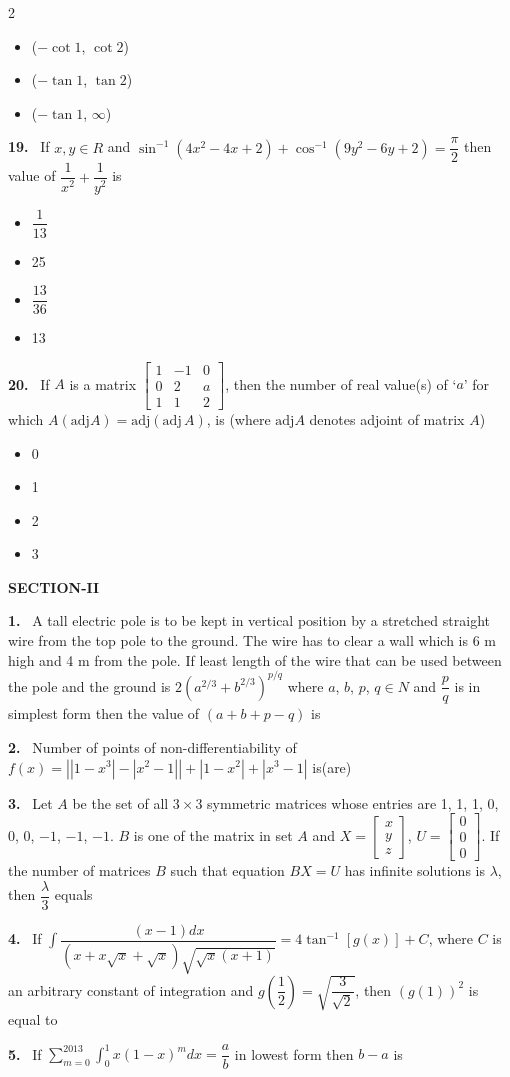 \documentclass[10pt]{extarticle}
\newcommand{\sect}[1]{\par\smallskip\noindent\textbf{#1}\par}
\newcommand{\qn}[1]{\par\smallskip\noindent\textbf{#1.}~}
\newenvironment{qoptions}{\begin{itemize}[leftmargin=1.8em,itemsep=1pt,topsep=2pt,label={}]}{\end{itemize}}
\newcommand{\opt}[2]{\item[(#1)] #2}
\begin{document}
\begin{multicols}{2}
\begin{qoptions}
\opt{B}{($-\cot1$, $\cot2$)}
\opt{C}{($-\tan1$, $\tan2$)}
\opt{D}{($-\tan1$, $\infty$)}
\end{qoptions}
\qn{19} If $x,y\in R$ and $\sin^{-1}\left(4x^2-4x+2\right)+\cos^{-1}\left(9y^2-6y+2\right)=\dfrac\pi2$ then value of $\dfrac1{x^2}+\dfrac1{y^2}$ is
\begin{qoptions}
\opt{A}{$\dfrac1{13}$}
\opt{B}{25}
\opt{C}{$\dfrac{13}{36}$}
\opt{D}{13}
\end{qoptions}
\qn{20} If $A$ is a matrix $\begin{bmatrix}1&-1&0\\0&2&a\\1&1&2\end{bmatrix}$, then the number of real value(s) of `$a$' for which $A(\mathrm{adj}A)=\mathrm{adj}(\mathrm{adj}\,A)$, is (where $\mathrm{adj}A$ denotes adjoint of matrix $A$)
\begin{qoptions}
\opt{A}{0}
\opt{B}{1}
\opt{C}{2}
\opt{D}{3}
\end{qoptions}
\sect{SECTION-II}
\qn{1} A tall electric pole is to be kept in vertical position by a stretched straight wire from the top pole to the ground. The wire has to clear a wall which is 6 m high and 4 m from the pole. If least length of the wire that can be used between the pole and the ground is $2\left(a^{2/3}+b^{2/3}\right)^{p/q}$ where $a$, $b$, $p$, $q\in N$ and $\dfrac pq$ is in simplest form then the value of $(a+b+p-q)$ is
\qn{2} Number of points of non-differentiability of $f(x)=\left|\left|1-x^3\right|-\left|x^2-1\right|\right|+\left|1-x^2\right|+\left|x^3-1\right|$ is(are)
\qn{3} Let $A$ be the set of all $3\times3$ symmetric matrices whose entries are 1, 1, 1, 0, 0, 0, $-1$, $-1$, $-1$. $B$ is one of the matrix in set $A$ and $X=\begin{bmatrix}x\\y\\z\end{bmatrix}$, $U=\begin{bmatrix}0\\0\\0\end{bmatrix}$. If the number of matrices $B$ such that equation $BX=U$ has infinite solutions is $\lambda$, then $\dfrac\lambda3$ equals
\qn{4} If $\displaystyle\int\dfrac{(x-1)dx}{\left(x+x\sqrt x+\sqrt x\right)\sqrt{\sqrt x(x+1)}}=4\tan^{-1}[g(x)]+C$, where $C$ is an arbitrary constant of integration and $g\!\left(\dfrac12\right)=\sqrt{\dfrac3{\sqrt2}}$, then $(g(1))^2$ is equal to
\qn{5} If $\displaystyle\sum_{m=0}^{2013}\int_0^1x(1-x)^mdx=\dfrac ab$ in lowest form then $b-a$ is

\end{multicols}
\end{document}
